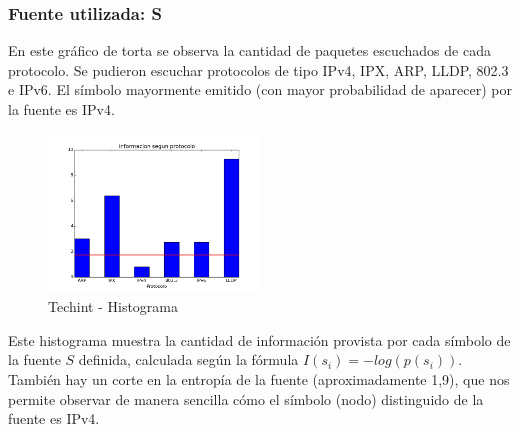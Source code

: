 \documentclass[final,narroweqnarray,inline]{ieee}
\begin{document}
\subsubsection{Fuente utilizada: S}



En este gráfico de torta se observa la cantidad de paquetes escuchados de cada
protocolo. Se pudieron escuchar protocolos de tipo IPv4, IPX, ARP, LLDP,
802.3 e IPv6. El símbolo mayormente emitido (con mayor probabilidad de
aparecer) por la fuente es IPv4.

\begin{figure}
\begin{center}
  \includegraphics[width=0.5\textwidth]{graficos/techint_histogram.png}
  \caption{Techint - Histograma}
  \label{techint-pie}
\end{center}
\end{figure}

Este histograma muestra la cantidad de información provista por cada símbolo
de la fuente $S$ definida, calculada según la fórmula $ I(s_{i}) =
-log(p(s_{i}))  $. También hay un corte en la entropía de la fuente
(aproximadamente 1,9), que nos permite observar de manera sencilla cómo el símbolo (nodo)
distinguido de la fuente es IPv4.
\end{document}
